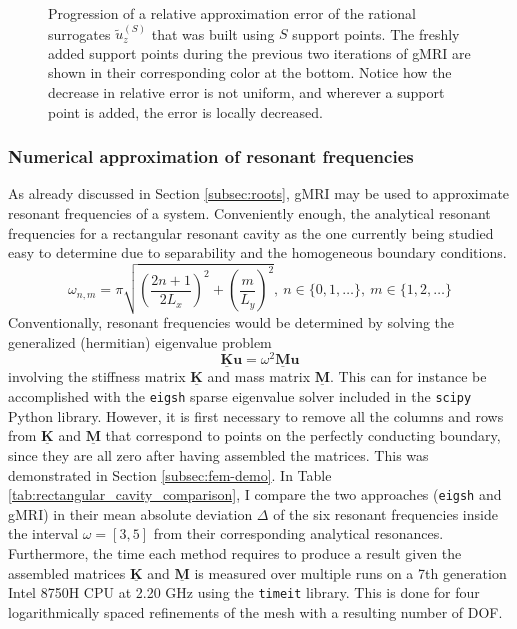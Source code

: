 \documentclass[11pt, a4paper]{article}
\begin{document}
\begin{figure}[ht]
    \centering
    
    \caption{Progression of a relative approximation error of the rational
    surrogates $\tilde{u}_z^{(S)}$ that was built using $S$ support points.
    The freshly added support points during the previous two iterations of
    \acrshort{gMRI} are shown in their corresponding color at the bottom.
    Notice how the decrease in relative error is not uniform, and wherever a
    support point is added, the error is locally decreased.}
    \label{fig:rectangular-cavity-errorprogression}
\end{figure}

\subsubsection{Numerical approximation of resonant frequencies}
\label{subsubsec:root-finding}

As already discussed in Section \ref{subsec:roots}, \acrshort{gMRI} may be used
to approximate resonant frequencies of a system. Conveniently enough, the analytical
resonant frequencies for a rectangular resonant cavity as the one currently being 
studied easy to determine due to separability and the homogeneous boundary conditions. 
\begin{equation}
    \omega_{n, m} = \pi \sqrt{\left(\frac{2n + 1}{2L_x}\right)^2 + \left(\frac{m}{L_y}\right)^2},
    ~n \in \{0, 1, \dots\}, ~m \in \{1, 2, \dots \} \label{equ:analytical-eigenmodes}
\end{equation}
Conventionally, resonant frequencies would be determined by solving the generalized
(hermitian) eigenvalue problem
\begin{equation}
    \mathbf{\underline{K}} \mathbf{u} = \omega^2 \mathbf{\underline{M}} \mathbf{u}
    \label{equ:numerical-eigenmodes}
\end{equation}
involving the stiffness matrix $\mathbf{\underline{K}}$ and mass matrix $\mathbf{\underline{M}}$.
This can for instance be accomplished with the \texttt{eigsh} sparse eigenvalue
solver included in the \texttt{scipy} Python library. However, it is first necessary
to remove all the columns and rows from $\mathbf{\underline{K}}$ and $\mathbf{\underline{M}}$
that correspond to points on the perfectly conducting boundary, since they are
all zero after having assembled the matrices. This was demonstrated in Section
\ref{subsec:fem-demo}. In Table \ref{tab:rectangular_cavity_comparison}, I compare
the two approaches (\texttt{eigsh} and \acrshort{gMRI}) in their mean absolute deviation
$\Delta$ of the six resonant frequencies inside the interval $\omega = [3, 5]$ 
from their corresponding analytical resonances. Furthermore, the time each method
requires to produce a result given the assembled matrices $\mathbf{\underline{K}}$
and $\mathbf{\underline{M}}$ is measured over multiple runs on a 7th generation
Intel 8750H CPU at 2.20 GHz using the \texttt{timeit} library. This is done
for four logarithmically spaced refinements of the mesh with a resulting number
of \acrfull{DOF}.
\end{document}
